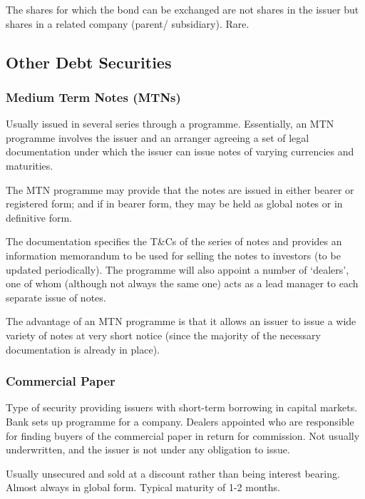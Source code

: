 \documentclass[
]{article}
\begin{document}
The shares for which the bond can be exchanged are not shares in the
issuer but shares in a related company (parent/ subsidiary). Rare.

\hypertarget{other-debt-securities}{%
\subsection{Other Debt Securities}\label{other-debt-securities}}

\hypertarget{medium-term-notes-mtns}{%
\subsubsection{Medium Term Notes (MTNs)}\label{medium-term-notes-mtns}}

Usually issued in several series through a programme. Essentially, an
MTN programme involves the issuer and an arranger agreeing a set of
legal documentation under which the issuer can issue notes of varying
currencies and maturities.

The MTN programme may provide that the notes are issued in either bearer
or registered form; and if in bearer form, they may be held as global
notes or in definitive form.

The documentation specifies the T\&Cs of the series of notes and
provides an information memorandum to be used for selling the notes to
investors (to be updated periodically). The programme will also appoint
a number of `dealers', one of whom (although not always the same one)
acts as a lead manager to each separate issue of notes.

The advantage of an MTN programme is that it allows an issuer to issue a
wide variety of notes at very short notice (since the majority of the
necessary documentation is already in place).

\hypertarget{commercial-paper}{%
\subsubsection{Commercial Paper}\label{commercial-paper}}

Type of security providing issuers with short-term borrowing in capital
markets. Bank sets up programme for a company. Dealers appointed who are
responsible for finding buyers of the commercial paper in return for
commission. Not usually underwritten, and the issuer is not under any
obligation to issue.

Usually unsecured and sold at a discount rather than being interest
bearing. Almost always in global form. Typical maturity of 1-2 months.
\end{document}
